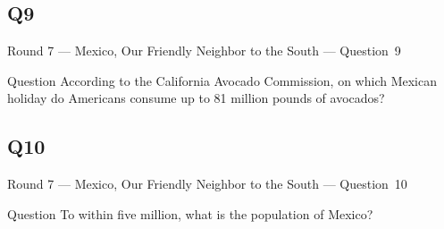 \documentclass[11pt,draft]{beamer}
\begin{document}
\subsection*{Q9}
\begin{frame}[t]{Round 7 --- Mexico, Our Friendly Neighbor to the South --- \mbox{Question 9}}
    \begin{block}{Question}
        According to the California Avocado Commission, on which Mexican holiday do Americans consume up to 81 million pounds of  avocados?
    \end{block}
\end{frame}
\subsection*{Q10}
\begin{frame}[t]{Round 7 --- Mexico, Our Friendly Neighbor to the South --- \mbox{Question 10}}
    \begin{block}{Question}
        To within five million, what is the population of Mexico?
    \end{block}
\end{frame}
\end{document}
